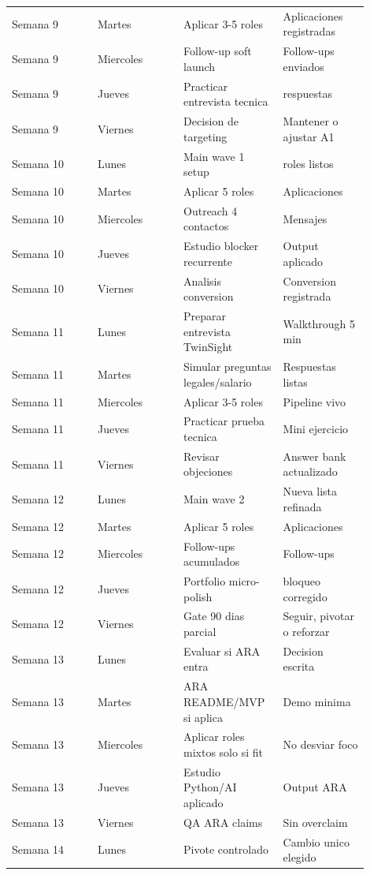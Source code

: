 \begin{center}
\begin{longtable}{>{\raggedright\arraybackslash}p{0.225\linewidth} >{\raggedright\arraybackslash}p{0.225\linewidth} >{\raggedright\arraybackslash}p{0.225\linewidth} >{\raggedright\arraybackslash}p{0.225\linewidth}}
Semana 9 & Martes & Aplicar 3-5 roles & Aplicaciones registradas \\
Semana 9 & Miercoles & Follow-up soft launch & Follow-ups enviados \\
Semana 9 & Jueves & Practicar entrevista tecnica & 5 respuestas \\
Semana 9 & Viernes & Decision de targeting & Mantener o ajustar A1 \\
Semana 10 & Lunes & Main wave 1 setup & 10 roles listos \\
Semana 10 & Martes & Aplicar 5 roles & Aplicaciones \\
Semana 10 & Miercoles & Outreach 4 contactos & Mensajes \\
Semana 10 & Jueves & Estudio blocker recurrente & Output aplicado \\
Semana 10 & Viernes & Analisis conversion & Conversion registrada \\
Semana 11 & Lunes & Preparar entrevista TwinSight & Walkthrough 5 min \\
Semana 11 & Martes & Simular preguntas legales/salario & Respuestas listas \\
Semana 11 & Miercoles & Aplicar 3-5 roles & Pipeline vivo \\
Semana 11 & Jueves & Practicar prueba tecnica & Mini ejercicio \\
Semana 11 & Viernes & Revisar objeciones & Answer bank actualizado \\
Semana 12 & Lunes & Main wave 2 & Nueva lista refinada \\
Semana 12 & Martes & Aplicar 5 roles & Aplicaciones \\
Semana 12 & Miercoles & Follow-ups acumulados & Follow-ups \\
Semana 12 & Jueves & Portfolio micro-polish & 1 bloqueo corregido \\
Semana 12 & Viernes & Gate 90 dias parcial & Seguir, pivotar o reforzar \\
Semana 13 & Lunes & Evaluar si ARA entra & Decision escrita \\
Semana 13 & Martes & ARA README/MVP si aplica & Demo minima \\
Semana 13 & Miercoles & Aplicar roles mixtos solo si fit & No desviar foco \\
Semana 13 & Jueves & Estudio Python/AI aplicado & Output ARA \\
Semana 13 & Viernes & QA ARA claims & Sin overclaim \\
Semana 14 & Lunes & Pivote controlado & Cambio unico elegido \\

\end{longtable}
\end{center}
